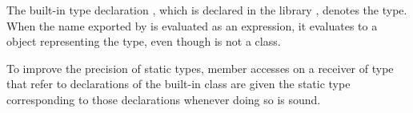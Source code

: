 \documentclass[makeidx]{article}
\begin{document}

\LMHash{}%
The built-in type declaration ,
which is declared in the library ,
denotes the \DYNAMIC{} type.
When the name \DYNAMIC{} exported by  is evaluated
as an expression,
it evaluates to a  object representing the \DYNAMIC{} type,
even though \DYNAMIC{} is not a class.


\LMHash{}%
To improve the precision of static types,
member accesses on a receiver of type \DYNAMIC{} that refer to
declarations of the built-in class 
are given the static type corresponding to those declarations
whenever doing so is sound.
\end{document}
